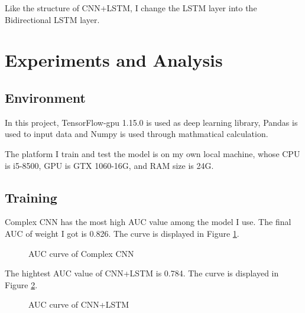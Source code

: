\documentclass{article}
\begin{document}
Like the structure of CNN+LSTM, I change the LSTM layer into the Bidirectional LSTM layer. 

\section{Experiments and Analysis}
\subsection{Environment}
In this project, TensorFlow-gpu 1.15.0 is used as deep learning library, Pandas is used to input data and Numpy is used through mathmatical calculation.

The platform I train and test the model is on my own local machine, whose CPU is i5-8500, GPU is GTX 1060-16G, and RAM size is 24G.

\subsection{Training}
Complex CNN has the most high AUC value among the model I use. The final AUC of weight I got is 0.826. The curve is displayed in Figure \ref{CNN}.

\begin{figure}[h]
	\centering
	\caption{AUC curve of Complex CNN}
	\label{CNN}
\end{figure} 

The hightest AUC value of CNN+LSTM is 0.784. The curve is displayed in Figure \ref{CNN+LSTM}.

\begin{figure}[h]
	\centering
	\caption{AUC curve of CNN+LSTM}
	\label{CNN+LSTM}
\end{figure} 
\end{document}
